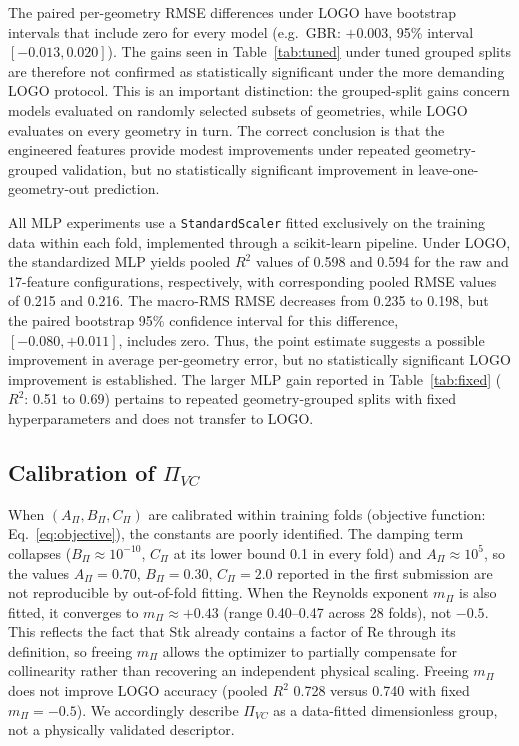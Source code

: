\documentclass[12pt]{article}
\newcommand{\PiVC}{\Pi_{VC}}
\begin{document}
The paired per-geometry RMSE differences under LOGO have bootstrap intervals that include zero for every model (e.g.\ GBR: $+0.003$, 95\% interval $[-0.013, 0.020]$). The gains seen in Table~\ref{tab:tuned} under tuned grouped splits are therefore not confirmed as statistically significant under the more demanding LOGO protocol. This is an important distinction: the grouped-split gains concern models evaluated on randomly selected subsets of geometries, while LOGO evaluates on every geometry in turn. The correct conclusion is that the engineered features provide modest improvements under repeated geometry-grouped validation, but no statistically significant improvement in leave-one-geometry-out prediction.

All MLP experiments use a \texttt{StandardScaler} fitted exclusively on the training data within each fold, implemented through a scikit-learn pipeline. Under LOGO, the standardized MLP yields pooled $R^2$ values of 0.598 and 0.594 for the raw and 17-feature configurations, respectively, with corresponding pooled RMSE values of 0.215 and 0.216. The macro-RMS RMSE decreases from 0.235 to 0.198, but the paired bootstrap 95\% confidence interval for this difference, $[-0.080, +0.011]$, includes zero. Thus, the point estimate suggests a possible improvement in average per-geometry error, but no statistically significant LOGO improvement is established. The larger MLP gain reported in Table~\ref{tab:fixed} ($R^2$: 0.51 to 0.69) pertains to repeated geometry-grouped splits with fixed hyperparameters and does not transfer to LOGO.

\subsection{Calibration of $\PiVC$}
\label{sec:calibration}

When $(A_\Pi, B_\Pi, C_\Pi)$ are calibrated within training folds (objective function: Eq.~\eqref{eq:objective}), the constants are poorly identified. The damping term collapses ($B_\Pi \approx 10^{-10}$, $C_\Pi$ at its lower bound 0.1 in every fold) and $A_\Pi \approx 10^{5}$, so the values $A_\Pi=0.70$, $B_\Pi=0.30$, $C_\Pi=2.0$ reported in the first submission are not reproducible by out-of-fold fitting. When the Reynolds exponent $m_\Pi$ is also fitted, it converges to $m_\Pi \approx +0.43$ (range 0.40--0.47 across 28 folds), not $-0.5$. This reflects the fact that Stk already contains a factor of Re through its definition, so freeing $m_\Pi$ allows the optimizer to partially compensate for collinearity rather than recovering an independent physical scaling. Freeing $m_\Pi$ does not improve LOGO accuracy (pooled $R^2$ 0.728 versus 0.740 with fixed $m_\Pi=-0.5$). We accordingly describe $\PiVC$ as a data-fitted dimensionless group, not a physically validated descriptor.
\end{document}
